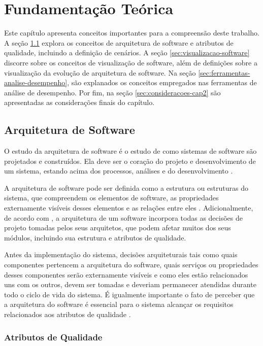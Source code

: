 \chapter{Fundamentação Teórica} \label{ch:fundamentacao-teorica}

Este capítulo apresenta conceitos importantes para a compreensão deste trabalho. A seção \ref{sec:arquitetura-software} explora os conceitos de arquitetura de software e atributos de qualidade, incluindo a definição de cenários. A seção \ref{sec:visualizacao-software} discorre sobre os conceitos de visualização de software, além de definições sobre a visualização da evolução de arquitetura de software. Na seção \ref{sec:ferramentas-analise-desempenho}, são explanados os conceitos empregados nas ferramentas de análise de desempenho. Por fim, na seção \ref{sec:consideracoes-cap2} são apresentadas as considerações finais do capítulo.

\section{Arquitetura de Software} \label{sec:arquitetura-software}

O estudo da arquitetura de software é o estudo de como sistemas de software são projetados e construídos. Ela deve ser o coração do projeto e desenvolvimento de um sistema, estando acima dos processos, análises e do desenvolvimento \cite{Taylor2009}.

A arquitetura de software pode ser definida como a estrutura ou estruturas do sistema, que compreendem os elementos de software, as propriedades externamente visíveis desses elementos e as relações entre eles \cite{Bass2007}. Adicionalmente, de acordo com \citeauthor{Taylor2009}, a arquitetura de um software incorpora todas as decisões de projeto tomadas pelos seus arquitetos, que podem afetar muitos dos seus módulos, incluindo sua estrutura e atributos de qualidade.

Antes da implementação do sistema, decisões arquiteturais tais como quais componentes pertencem a arquitetura do software, quais serviços ou propriedades desses componentes serão externamente visíveis e como eles estão relacionados uns com os outros, devem ser tomadas e deveriam permanecer atendidas durante todo o ciclo de vida do sistema. É igualmente importante o fato de  perceber que a arquitetura do software é essencial para o sistema alcançar os requisitos relacionados aos atributos de qualidade \cite{Kazman2001}.

\subsection{Atributos de Qualidade} \label{subsec:atributos-qualidade}

